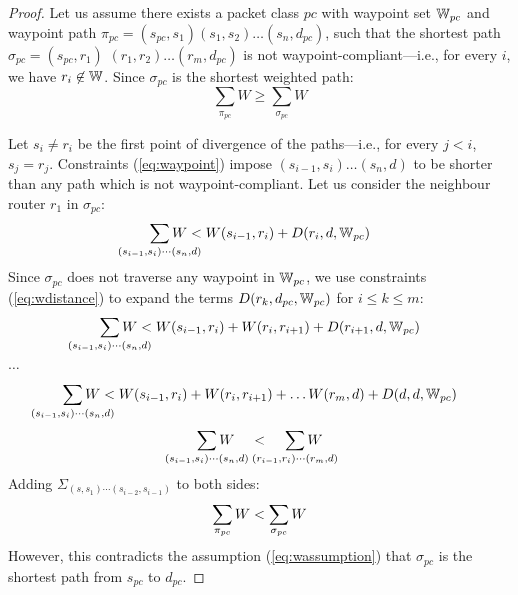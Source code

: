 
\begin{proof}
	Let us assume there exists a packet class $pc$ with waypoint set $\mathbb{W}_{pc}$ 
	and waypoint path $\pi_{pc} = (s_{pc}, s_1)(s_1, s_2)\ldots (s_n, d_{pc})$, 
	such that  the 
	shortest path $\sigma_{pc}=(s_{pc}, r_1)$ $(r_1, r_2)\ldots (r_m, d_{pc})$ 
	is not waypoint-compliant---i.e.,  
	for every $i$, we have $r_i\not\in \mathbb{W}$.	
	Since $\sigma_{pc}$ is the shortest weighted path: 
	\begin{equation} \label{eq:wassumption}
	\sum_{\pi_{pc}} W \geq \sum_{\sigma_{pc}} W
	\end{equation}

	
	Let $s_i \not= r_i$ be the first point of divergence of the paths---i.e., for every $j<i$, $s_{j} = r_{j}$.
Constraints (\ref{eq:waypoint}) impose 
$(s_{i-1}, s_i)\ldots(s_n, d)$ to be 
shorter than any path which is not waypoint-compliant. 
Let us consider the neighbour router $r_1$ in $\sigma_{pc}$:
	\[
	\sum_{\mathclap{\substack{(s_{i-1}, s_i)\cdots(s_n, d)}}} 
	W < W(s_{i-1}, r_i)+ D(r_i, d, \waypt_{pc})
	\]
	Since $\sigma_{pc}$ does not traverse any waypoint in $\mathbb{W}_{pc}$,
	we use constraints (\ref{eq:wdistance}) 
	to expand the terms $D(r_k, d_{pc}, \mathbb{W}_{pc})$ for $i \leq k \leq m$:
	\[
	\sum_{\mathclap{\substack{(s_{i-1}, s_i)\cdots(s_n, d)}}} 
	W < W(s_{i-1}, r_i)+ W(r_i, r_{i+1}) + D(r_{i+1}, d,\waypt_{pc})
	\] 
	\begin{center}
		$\ldots$
	\end{center}
	\[
	\sum_{\mathclap{\substack{(s_{i-1}, s_i)\cdots(s_n, d)}}} 
	W < W(s_{i-1}, r_i)+ W(r_i, r_{i+1}) + \ldots W(r_{m}, d) + D(d, d, \waypt_{pc})
	\] 
	\[
	\sum_{\mathclap{\substack{(s_{i-1}, s_i)\cdots(s_n, d)}}} 
	W \hspace{0.4cm}< \hspace{0.4cm}
	\sum_{\mathclap{\substack{(r_{i-1}, r_i)\cdots(r_m, d)}}} 
	W
	\]
	Adding $\Sigma_{(s, s_1)\cdots(s_{i-2},s_{i-1})}$ to both sides:
	\[
	\sum_{\mathclap{\substack{\pi_{pc}}}} 
	W < 
	\sum_{\mathclap{\substack{\sigma_{pc}}}} 
	W
	\] 
However, this contradicts the assumption (\ref{eq:wassumption}) that 
$\sigma_{pc}$ is the shortest path from $s_{pc}$ to $d_{pc}$. 
\end{proof}
